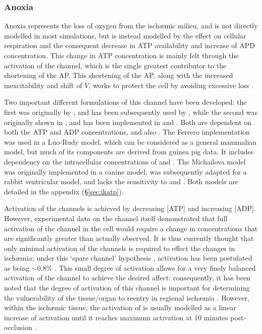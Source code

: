 \documentclass[../thesis-main.tex]{subfiles}
\begin{document}
 \subsubsection{Anoxia}
 \label{subsubsec:Anoxia}
 Anoxia represents the loss of oxygen from the isch\ae{}mic milieu, and is not directly modelled in most simulations, but is instead modelled by the effect on cellular respiration and the consequent decrease in ATP availability and increase of APD concentration. This change in ATP concentration is mainly felt through the activation of the \ikatp{} channel, which is the single greatest contributor to the shortening of the AP. This shortening of the AP, along with the increased inexcitability and shift of $V$, works to protect the cell by avoiding excessive \K{} loss \citep{Carmeliet1999}.
 
 Two important different formulations of this channel have been developed: the first was originally by \citet{Ferrero1996}, and has been subsequently used by \citet{Trenor2007}, while the second was originally shown in \citet{Michailova2005}, and has been implemented in \citet{Terkildsen2007} and \citet{Michailova2007}. Both are dependent on both the ATP and ADP concentrations, and also \ko{}. The Ferrero implementation was used in a Luo-Rudy model, which can be considered as a general mammalian model, but much of its components are derived from guinea pig data. It includes dependency on the intracellular concentrations of \na{} and \mg{}. The Michailova model was originally implemented in a canine model, was subsequently adapted for a rabbit ventricular model, and lacks the sensitivity to \na{} and \mg{}. Both models are detailed in the appendix (\S\ref{sec:ikatp}).
 
 Activation of the \ikatp{} channels is achieved by decreasing [ATP] and increasing [ADP]. However, experimental data on the channel itself demonstrated that full activation of the channel in the cell would require a change in concentrations that are significantly greater than actually observed. It is thus currently thought that only minimal activation of the \ikatp{} channels is required to effect the changes in isch\ae{}mia; under this `spare channel' hypothesis \citep{Cook1988}, activation has been postulated as being $\sim0.8\%$ \citep{Rodriguez2002, Weiss1992, Ferrero1996, Trenor2007, Ferrero2003}. This small degree of activation allows for a very finely balanced activation of the channel to achieve the desired affect: consequently, it has been noted that the degree of activation of this channel is important for determining the vulnerability of the tissue/organ to reentry in regional isch\ae{}mia \citep{Ferrero2003a, Trenor2005}. However, within the isch\ae{}mic tissue, the activation of \ikatp{} is usually modelled as a linear increase of activation until it reaches maximum activation at 10 minutes post-occlusion \citep{Trenor2007, Tice2007}.
 
\end{document}
